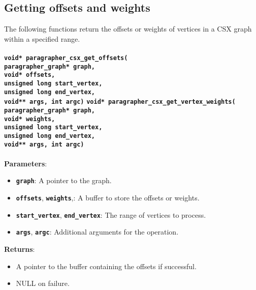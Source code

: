 \documentclass[a4paper]{article}
\begin{document}
\subsection{Getting offsets and weights}
The following functions return the offsets or weights of vertices in a CSX graph within a specified range.
\\
\\
\textbf{\texttt{void* paragrapher\_csx\_get\_offsets(
\\{\indent}paragrapher\_graph* graph,
\\{\indent}void* offsets,
\\{\indent}unsigned long start\_vertex,
\\{\indent}unsigned long end\_vertex,
\\{\indent}void** args, int argc)}}
\newline
\newline
\textbf{\texttt{void* paragrapher\_csx\_get\_vertex\_weights(
\\{\indent}paragrapher\_graph* graph,
\\{\indent}void* weights,
\\{\indent}unsigned long start\_vertex,
\\{\indent}unsigned long end\_vertex,
\\{\indent}void** args, int argc)}}
\\
\\
\textbf{Parameters}:
\begin{itemize}
    \setlength{\itemsep}{0pt}
    \setlength{\parskip}{0pt}
    \setlength{\parsep}{0pt}

    \item \textbf{\texttt{graph}}: A pointer to the graph.
    \item \textbf{\texttt{offsets}}, \textbf{\texttt{weights}},: A buffer to store the offsets or weights.
    \item \textbf{\texttt{start\_vertex}}, \textbf{\texttt{end\_vertex}}: The range of vertices to process.
    \item \textbf{\texttt{args}}, \textbf{\texttt{argc}}: Additional arguments for the operation.
\end{itemize}
\textbf{Returns}:
\begin{itemize}
    \setlength{\itemsep}{0pt}
    \setlength{\parskip}{0pt}
    \setlength{\parsep}{0pt}

    \item A pointer to the buffer containing the offsets if successful.
    \item NULL on failure.
\end{itemize}
\end{document}
